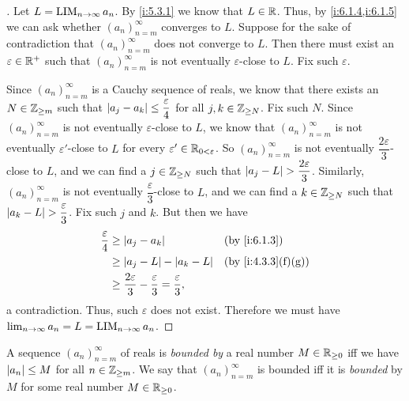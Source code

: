 \begin{proof}[]
  Let \(L = \operatorname*{LIM}_{n \to \infty} a_n\).
  By \cref{i:5.3.1} we know that \(L \in \mathbb{R}\).
  Thus, by \cref{i:6.1.4,i:6.1.5} we can ask whether \((a_n)_{n = m}^\infty\) converges to \(L\).
  Suppose for the sake of contradiction that \((a_n)_{n = m}^\infty\) does not converge to \(L\).
  Then there must exist an \(\varepsilon \in \mathbb{R}^+\) such that \((a_n)_{n = m}^\infty\) is not eventually \(\varepsilon\)-close to \(L\).
  Fix such \(\varepsilon\).

  Since \((a_n)_{n = m}^\infty\) is a Cauchy sequence of reals, we know that there exists an \(N \in \mathbb{Z}_{\geq m}\) such that \(\left\lvert a_j - a_k\right\rvert \leq \dfrac{\varepsilon}{4}\) for all \(j, k \in \mathbb{Z}_{\geq N}\).
  Fix such \(N\).
  Since \((a_n)_{n = m}^\infty\) is not eventually \(\varepsilon\)-close to \(L\), we know that \((a_n)_{n = m}^\infty\) is not eventually \(\varepsilon'\)-close to \(L\) for every \(\varepsilon' \in \mathbb{R}_{0 < \varepsilon}\).
  So \((a_n)_{n = m}^\infty\) is not eventually \(\dfrac{2 \varepsilon}{3}\)-close to \(L\), and we can find a \(j \in \mathbb{Z}_{\geq N}\) such that \(\left\lvert a_j - L\right\rvert > \dfrac{2 \varepsilon}{3}\).
  Similarly, \((a_n)_{n = m}^\infty\) is not eventually \(\dfrac{\varepsilon}{3}\)-close to \(L\), and we can find a \(k \in \mathbb{Z}_{\geq N}\) such that \(\left\lvert a_k - L\right\rvert > \dfrac{\varepsilon}{3}\).
  Fix such \(j\) and \(k\).
  But then we have
  \begin{align*}
    \dfrac{\varepsilon}{4} & \geq \abs{a_j - a_k}                                                             &  & \by{i:6.1.3}      \\
                           & \geq \abs{a_j - L} - \abs{a_k - L}                                               &  & \by{i:4.3.3}[f,g] \\
                           & \geq \dfrac{2 \varepsilon}{3} - \dfrac{\varepsilon}{3} = \dfrac{\varepsilon}{3},
  \end{align*}
  a contradiction.
  Thus, such \(\varepsilon\) does not exist.
  Therefore we must have \(\lim_{n \to \infty} a_n = L = \operatorname*{LIM}_{n \to \infty} a_n\).
\end{proof}

\begin{defn}\label{i:6.1.16}
  A sequence \((a_n)_{n = m}^\infty\) of reals is \emph{bounded by} a real number \(M \in \mathbb{R}_{\geq 0}\) iff we have \(\left\lvert a_n\right\rvert \leq M\) for all \(n \in \mathbb{Z}_{\geq m}\).
  We say that \((a_n)_{n = m}^\infty\) is bounded iff it is \emph{bounded} by \(M\) for some real number \(M \in \mathbb{R}_{\geq 0}\).
\end{defn}

